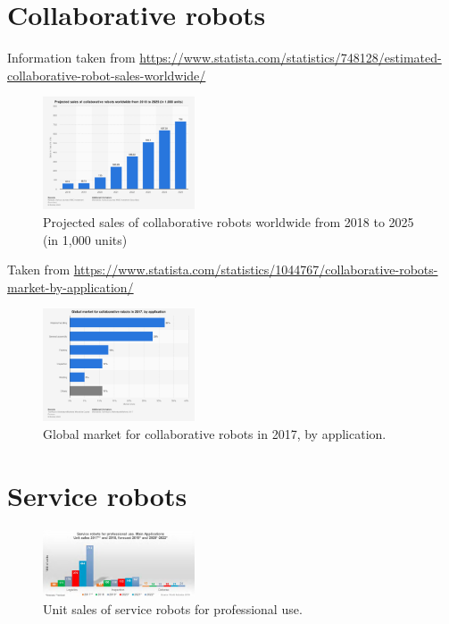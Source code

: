 \begin{appendices}
	\section{Collaborative robots}
	Information taken from \url{https://www.statista.com/statistics/748128/estimated-collaborative-robot-sales-worldwide/}
	\begin{figure}[!ht]
		\centering
		\includegraphics[width=0.4\textwidth]{fig/cobots_global_sales_2018_2025}
		\caption{Projected sales of collaborative robots worldwide from 2018 to 2025 (in 1,000 units)}
		\label{fig:cobots_sales_projection}
	\end{figure}
	
	Taken from \url{https://www.statista.com/statistics/1044767/collaborative-robots-market-by-application/}
	\begin{figure}[!ht]
		\centering
		\includegraphics[width=0.4\textwidth]{fig/global_market_size_cobots_by_application}
		\caption{Global market for collaborative robots in 2017, by application.}
		\label{fig:global_market_size_cobots_by_application}
	\end{figure}
	
	\section{Service robots}
	\begin{figure}[h]
		\centering
		\includegraphics[width=0.4\textwidth]{fig/service_robots_professional_use_main_app_sales}
		\caption{Unit sales of service robots for professional use.}
		\label{fig:service_robots_professional_use_main_app_sales}
	\end{figure}
	

\end{appendices}
